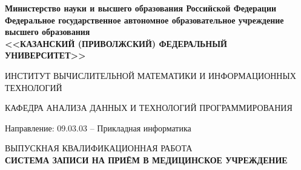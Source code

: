 \documentclass[a4paper,article]{article}
\begin{document}
\begin{sloppypar}
    \begin{titlepage}
        \begin{center}
            {\bfseries Министерство науки и высшего образования Российской Федерации \\
            Федеральное государственное автономное образовательное учреждение \\
            высшего образования \\
            <<КАЗАНСКИЙ (ПРИВОЛЖСКИЙ) ФЕДЕРАЛЬНЫЙ УНИВЕРСИТЕТ>>}
        \end{center}

        \begin{center}
            ИНСТИТУТ ВЫЧИСЛИТЕЛЬНОЙ МАТЕМАТИКИ И ИНФОРМАЦИОННЫХ ТЕХНОЛОГИЙ
        \end{center}

        \begin{center}
            КАФЕДРА АНАЛИЗА ДАННЫХ И ТЕХНОЛОГИЙ ПРОГРАММИРОВАНИЯ
        \end{center}

        \begin{center}
            Направление: 09.03.03 – Прикладная информатика
        \end{center}

        \vspace{0mm}

        \begin{center}
            ВЫПУСКНАЯ КВАЛИФИКАЦИОННАЯ РАБОТА \\
            {\bfseries СИСТЕМА ЗАПИСИ НА ПРИЁМ В МЕДИЦИНСКОЕ УЧРЕЖДЕНИЕ}
        \end{center}

        \vfill


\end{titlepage}
\end{sloppypar}
\end{document}
